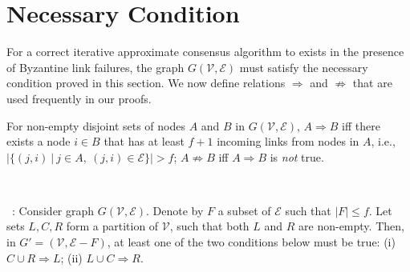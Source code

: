 \documentclass{llncs}
\newcommand{\scripte}{\mathcal{E}}
\newcommand{\scriptv}{\mathcal{V}}
\begin{document}
\section{Necessary Condition}
\label{s_necessary}





For a correct iterative approximate consensus algorithm to exists in the presence of Byzantine link failures, the graph $G(\scriptv, \scripte)$ must satisfy the necessary condition proved in this section.
We now define relations $\Rightarrow$
and $\not\Rightarrow$ that are used frequently in our proofs.

\begin{definition}
\label{def:absorb}
For non-empty disjoint sets of nodes $A$ and $B$ in $G(\scriptv, \scripte)$, $A \Rightarrow B$ iff there exists a node $i\in B$ that has at least $f+1$ incoming links from nodes in $A$, i.e., $|\{(j,i)~|~j\in A,~(j,i)\in\scripte\}|>f$; $A\not\Rightarrow B$ iff $A\Rightarrow B$ is {\em not} true.






\end{definition}

~

~: Consider graph $G(\scriptv, \scripte)$. Denote by $F$ a subset of $\scripte$ such that $|F| \leq f$.
Let sets $L,C,R$ form a partition of $\scriptv$, such that
both $L$ and $R$ are non-empty. Then, in $G' = (\scriptv, \scripte-F)$, at least one of the two conditions below must be true: (i) $C\cup R\Rightarrow L$; (ii) $L\cup C\Rightarrow R$.
\end{document}
